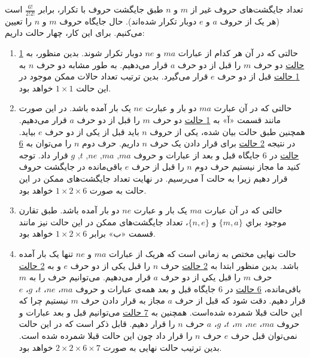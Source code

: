   \p
    تعداد جایگشت‌های حروف غیر از $m$ و $n$ طبق جایگشت حروف با تکرار، برابر $\frac{6!}{2!2!}$ است
    (هر یک از حروف $a$ و $e$ دوبار تکرار شده‌اند).
    حال جایگاه حروف $m$ و $n$ را تعیین می‌کنیم.
    برای این کار، چهار حالت داریم:
    \begin{enumerate}
      \item 
      حالتی که در آن هر کدام از عبارات $ma$ و $ne$
      دوبار تکرار شوند. بدین منظور، به
      \underline{1 حالت} 
       دو حرف 
      $m$ 
      را قبل از دو حرف 
      $a$
      قرار می‌دهیم.
      به طور مشابه دو حرف
       $n$ 
     به
     \underline{1 حالت}
       قبل از دو حرف 
       $e$
       قرار می‌گیرد.
      بدین ترتیب تعداد حالات ممکن موجود در این حالت 
      $1\times1$
      خواهد بود.
      
      \item
      حالتی که در آن عبارت $ma$ دو بار و عبارت $ne$ 
      یک بار آمده باشد. در این صورت مانند قسمت «آ» به
      \underline{1 حالت}  
       دو حرف 
      $m$
      را قبل از دو حرف 
      $a$
      قرار می‌دهیم.
      همچنین طبق حالت بیان شده، یکی از حروف 
      $n$ باید قبل از یکی از دو حرف $e$
      بیاید. در نتیجه
      \underline{2 حالت}
      برای قرار دادن یک حرف $n$ داریم. 
       حرف دوم 
      $n$
      را می‌توان به 
      \underline{6 حالت}
       در 6 جایگاه قبل و بعد از عبارات و حروف
      $ma$, 
      $ma$, 
      $ne$, 
      $t$,   
      $g$
      قرار داد.
      توجه کنید ما مجاز نیستیم حرف دوم
      $n$
      را قبل از حرف $e$
      باقی‌مانده در جایگشت حروف قرار دهیم زیرا به حالت آ می‌رسیم.
     در نهایت تعداد جایگشت‌های ممکن در این حالت به صورت 
      $1\times 2\times 6$
      خواهد بود.

      \item
      حالتی که در آن عبارت $ma$ یک بار و عبارت $ne$
    دو بار آمده باشد.
      طبق تقارن موجود براي 
      $\{m,a\}$ و
      $\{n,e\}$، 
    تعداد جایگشت‌های ممکن در این حالت نیز مانند قسمت «ب» برابر 
    $1\times 2\times 6$ 
      خواهد بود.
      
      \item
      حالت نهایی مختص به زمانی است که هریک از عبارات $ma$ و $ne$ تنها یک بار آمده باشد.
      بدین منظور ابتدا به
      \underline{2 حالت}
      حرف 
      $n$
      را قبل یکی از دو حرف 
      $e$
      و به
      \underline{2 حالت}  
      حرف  
      $m$
      را قبل يكي از دو حرف 
      $a$ 
      قرار می‌دهیم.
      می‌توانیم حرف
       را به $m$ باقی‌مانده،
      \underline{6 حالت} 
       در 6 جایگاه
      قبل و بعد همه‌ی عبارات و حروف 
      $ma$، $ne$، $t$، $g$، $e$
       قرار دهیم.
      دقت شود که قبل از حرف $a$ مجاز به قرار دادن حرف $m$ نیستیم چرا که این حالت قبلا شمرده شده‌است.
      همچنین به 
      \underline{7 حالت}
      می‌توانیم قبل و بعد عبارات و حروف
      $ma$،
      $ne$،
      $m$،
      $t$، $g$، $a$
      حرف $n$ را قرار دهیم.
      قابل ذکر است که در این حالت نمی‌توان قبل حرف $e$
      حرف $n$ را قرار داد چون این حالت قبلا شمرده شده است.
      بدین ترتیب حالت نهایی به صورت 
      $2\times 2 \times 6 \times 7$
      خواهد بود.
    \end{enumerate}
